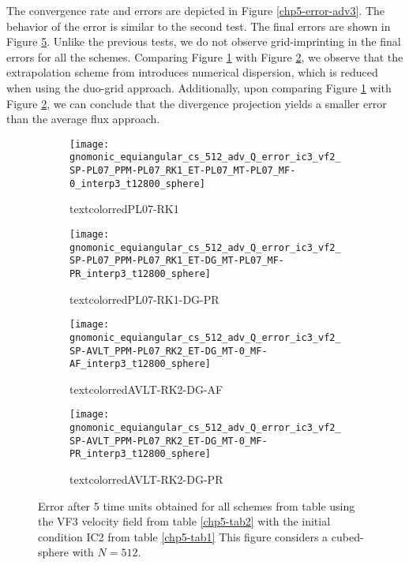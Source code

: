 The convergence rate and errors are depicted in Figure \ref{chp5-error-adv3}.
The behavior of the error is similar to the second test.
The final errors are shown in Figure \ref{chp5-adv3}.
Unlike the previous tests, we do not observe grid-imprinting in the final errors for all the schemes.
Comparing Figure \ref{chp5-adv3-s1} with Figure \ref{chp5-adv3-s2}, we observe that the extrapolation scheme from \citet{putman:2007}
introduces numerical dispersion, which is reduced when using the duo-grid approach.
Additionally, upon comparing Figure \ref{chp5-adv3-s1} with Figure \ref{chp5-adv3-s2},
we can conclude that the divergence projection yields a smaller error than the average flux approach.
\begin{figure}[!htb]
	\centering
	\begin{subfigure}{0.35\textwidth}
		\centering
		\texttt{[image: gnomonic\_equiangular\_cs\_512\_adv\_Q\_error\_ic3\_vf2\_SP-PL07\_PPM-PL07\_RK1\_ET-PL07\_MT-PL07\_MF-0\_interp3\_t12800\_sphere]}
		\caption{textcolor{red}{PL07-RK1} \label{chp5-adv3-s1}}
	\end{subfigure}
	\begin{subfigure}{0.35\textwidth}
		\centering
		\texttt{[image: gnomonic\_equiangular\_cs\_512\_adv\_Q\_error\_ic3\_vf2\_SP-PL07\_PPM-PL07\_RK1\_ET-DG\_MT-PL07\_MF-PR\_interp3\_t12800\_sphere]}
		\caption{textcolor{red}{PL07-RK1-DG-PR} \label{chp5-adv3-s2}}
	\end{subfigure}
	
	\begin{subfigure}{0.35\textwidth}
		\centering
		\texttt{[image: gnomonic\_equiangular\_cs\_512\_adv\_Q\_error\_ic3\_vf2\_SP-AVLT\_PPM-PL07\_RK2\_ET-DG\_MT-0\_MF-AF\_interp3\_t12800\_sphere]}
		\caption{textcolor{red}{AVLT-RK2-DG-AF} \label{chp5-adv3-s3}}
	\end{subfigure}
	\begin{subfigure}{0.35\textwidth}
		\centering
		\texttt{[image: gnomonic\_equiangular\_cs\_512\_adv\_Q\_error\_ic3\_vf2\_SP-AVLT\_PPM-PL07\_RK2\_ET-DG\_MT-0\_MF-PR\_interp3\_t12800\_sphere]}
		\caption{textcolor{red}{AVLT-RK2-DG-PR} \label{chp5-adv3-s4}}
	\end{subfigure}
	\caption{ Error after 5 time units obtained for all schemes from table using the VF3 velocity field from table \ref{chp5-tab2} with the initial condition IC2 from  table \ref{chp5-tab1} 
		This figure considers a cubed-sphere with $N=512$. \label{chp5-adv3}}
\end{figure}

